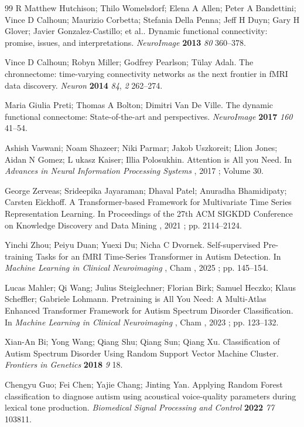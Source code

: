 \begin{thebibliography}{99}
R Matthew Hutchison; Thilo Womelsdorf; Elena A Allen; Peter A Bandettini; Vince D Calhoun; Maurizio Corbetta; Stefania Della Penna; Jeff H Duyn; Gary H Glover; Javier Gonzalez-Castillo; et al.. Dynamic functional connectivity: promise, issues, and interpretations. \textit{NeuroImage} \textbf{2013} \textit{80} 360--378.

Vince D Calhoun; Robyn Miller; Godfrey Pearlson; Tülay Adalı. The chronnectome: time-varying connectivity networks as the next frontier in fMRI data discovery. \textit{Neuron} \textbf{2014} \textit{84}, \textit{2} 262--274.

Maria Giulia Preti; Thomas A Bolton; Dimitri Van De Ville. The dynamic functional connectome: State-of-the-art and perspectives. \textit{NeuroImage} \textbf{2017} \textit{160} 41--54.

Ashish Vaswani; Noam Shazeer; Niki Parmar; Jakob Uszkoreit; Llion Jones; Aidan N Gomez; L ukasz Kaiser; Illia Polosukhin. Attention is All you Need. In \textit{Advances in Neural Information Processing Systems} , 2017 ; Volume 30.

George Zerveas; Srideepika Jayaraman; Dhaval Patel; Anuradha Bhamidipaty; Carsten Eickhoff. A Transformer-based Framework for Multivariate Time Series Representation Learning. In Proceedings of the 27th ACM SIGKDD Conference on Knowledge Discovery and Data Mining , 2021 ; pp. 2114--2124.

Yinchi Zhou; Peiyu Duan; Yuexi Du; Nicha C Dvornek. Self-supervised Pre-training Tasks for an fMRI Time-Series Transformer in Autism Detection. In \textit{Machine Learning in Clinical Neuroimaging} , Cham , 2025 ; pp. 145--154.

Lucas Mahler; Qi Wang; Julius Steiglechner; Florian Birk; Samuel Heczko; Klaus Scheffler; Gabriele Lohmann. Pretraining is All You Need: A Multi-Atlas Enhanced Transformer Framework for Autism Spectrum Disorder Classification. In \textit{Machine Learning in Clinical Neuroimaging} , Cham , 2023 ; pp. 123--132.

Xian-An Bi; Yong Wang; Qiang Shu; Qiang Sun; Qiang Xu. Classification of Autism Spectrum Disorder Using Random Support Vector Machine Cluster. \textit{Frontiers in Genetics} \textbf{2018} \textit{9} 18.

Chengyu Guo; Fei Chen; Yajie Chang; Jinting Yan. Applying Random Forest classification to diagnose autism using acoustical voice-quality parameters during lexical tone production. \textit{Biomedical Signal Processing and Control} \textbf{2022} \textit{77} 103811.


\end{thebibliography}
